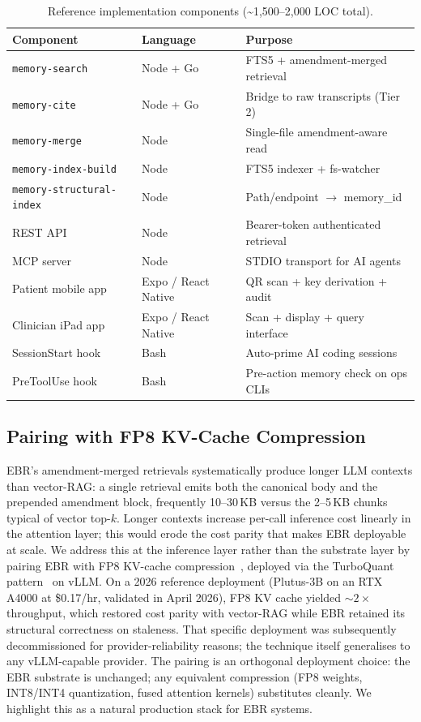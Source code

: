 \documentclass[runningheads]{llncs}
\begin{document}
\begin{table}[h]
\centering
\caption{Reference implementation components (\textasciitilde 1,500--2,000 LOC total).}
\label{tab:components}
\small
\begin{tabular}{lll}
\toprule
\textbf{Component} & \textbf{Language} & \textbf{Purpose} \\
\midrule
\texttt{memory-search} & Node + Go & FTS5 + amendment-merged retrieval \\
\texttt{memory-cite} & Node + Go & Bridge to raw transcripts (Tier 2) \\
\texttt{memory-merge} & Node & Single-file amendment-aware read \\
\texttt{memory-index-build} & Node & FTS5 indexer + fs-watcher \\
\texttt{memory-structural-index} & Node & Path/endpoint $\rightarrow$ memory\_id \\
REST API & Node & Bearer-token authenticated retrieval \\
MCP server & Node & STDIO transport for AI agents \\
Patient mobile app & Expo / React Native & QR scan + key derivation + audit \\
Clinician iPad app & Expo / React Native & Scan + display + query interface \\
SessionStart hook & Bash & Auto-prime AI coding sessions \\
PreToolUse hook & Bash & Pre-action memory check on ops CLIs \\
\bottomrule
\end{tabular}
\end{table}

\subsection{Pairing with FP8 KV-Cache Compression}
\label{sec:ebr-fp8}

EBR's amendment-merged retrievals systematically produce longer LLM contexts
than vector-RAG: a single retrieval emits both the canonical body and the
prepended amendment block, frequently 10--30\,KB versus the 2--5\,KB chunks
typical of vector top-$k$. Longer contexts increase per-call inference cost
linearly in the attention layer; this would erode the cost parity that makes
EBR deployable at scale. We address this at the inference layer rather than
the substrate layer by pairing EBR with FP8 KV-cache
compression~\cite{fp8kv2024}, deployed via the TurboQuant
pattern~\cite{turboquant2026} on vLLM. On a 2026 reference deployment
(Plutus-3B on an RTX A4000 at \$0.17/hr, validated in April 2026), FP8 KV
cache yielded $\sim 2\times$ throughput, which restored cost parity with
vector-RAG while EBR retained its structural correctness on staleness.
That specific deployment was subsequently decommissioned for
provider-reliability reasons; the technique itself generalises to any
vLLM-capable provider. The pairing is an orthogonal deployment choice: the
EBR substrate is unchanged; any equivalent compression (FP8 weights,
INT8/INT4 quantization, fused attention kernels) substitutes cleanly. We
highlight this as a natural production stack for EBR systems.
\end{document}
